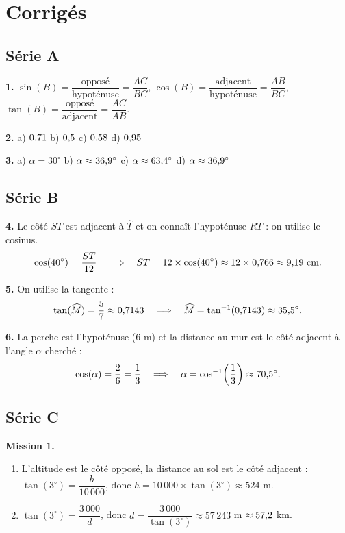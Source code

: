 \documentclass[../main.tex]{subfiles}
\begin{document}
\newpage
\section{Corrigés}

\subsection*{Série A}

\textbf{1.} $\sin(B) = \dfrac{\text{opposé}}{\text{hypoténuse}} = \dfrac{AC}{BC}$, \quad $\cos(B) = \dfrac{\text{adjacent}}{\text{hypoténuse}} = \dfrac{AB}{BC}$, \quad $\tan(B) = \dfrac{\text{opposé}}{\text{adjacent}} = \dfrac{AC}{AB}$.

\textbf{2.} a) $0{,} 71$ \quad b) $0{,} 5$ \quad c) $0{,} 58$ \quad d) $0{,} 95$

\textbf{3.} a) $\alpha = 30^\circ$ \quad b) $\alpha \approx 36{,} 9^\circ$ \quad c) $\alpha \approx 63{,} 4^\circ$ \quad d) $\alpha \approx 36{,} 9^\circ$

\subsection*{Série B}

\textbf{4.} Le côté $ST$ est adjacent à $\widehat{T}$ et on connaît l'hypoténuse $RT$ : on utilise le cosinus.
\[
\cos(40^\circ) = \frac{ST}{12} \quad\Longrightarrow\quad ST = 12 \times \cos(40^\circ) \approx 12 \times 0{,} 766 \approx 9{,} 19 \text{ cm}.
\]

\textbf{5.} On utilise la tangente :
\[
\tan(\widehat{M}) = \frac{5}{7} \approx 0{,} 7143 \quad\Longrightarrow\quad \widehat{M} = \tan^{-1}(0{,} 7143) \approx 35{,} 5^\circ.
\]

\textbf{6.} La perche est l'hypoténuse ($6$ m) et la distance au mur est le côté adjacent à l'angle $\alpha$ cherché :
\[
\cos(\alpha) = \frac{2}{6} = \frac{1}{3} \quad\Longrightarrow\quad \alpha = \cos^{-1}\!\left(\frac{1}{3}\right) \approx 70{,} 5^\circ.
\]

\subsection*{Série C}

\textbf{Mission 1.}
\begin{enumerate}[label=\alph*)]
  \item L'altitude est le côté opposé, la distance au sol est le côté adjacent : $\tan(3^\circ) = \dfrac{h}{10\,000}$, donc $h = 10\,000 \times \tan(3^\circ) \approx 524$ m.
  \item $\tan(3^\circ) = \dfrac{3\,000}{d}$, donc $d = \dfrac{3\,000}{\tan(3^\circ)} \approx 57\,243$ m $\approx 57{,} 2$ km.
\end{enumerate}
\end{document}
